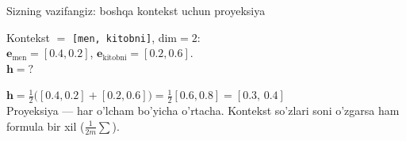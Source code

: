 \documentclass[aspectratio=169,11pt]{beamer}
\begin{document}
\begin{frame}{Sizning vazifangiz: boshqa kontekst uchun proyeksiya}
  \begin{tcolorbox}[warnbox,title=Savol --- 90 soniya]
    \small
    Kontekst $=$ \texttt{[men, kitobni]}, dim$=2$:\\[3pt]
    $\mathbf{e}_{\text{men}}=[0.4,0.2]$, \quad $\mathbf{e}_{\text{kitobni}}=[0.2,0.6]$.\\[4pt]
    \textbf{\large $\mathbf{h} = ?$}
  \end{tcolorbox}
  \pause
  \begin{tcolorbox}[okbox,title=Javob]
    \small
    $\mathbf{h} = \tfrac{1}{2}\big([0.4,0.2]+[0.2,0.6]\big)
       = \tfrac{1}{2}[0.6,0.8] = \mathbf{[0.3,\,0.4]}$\\[3pt]
    \footnotesize Proyeksiya --- har o'lcham bo'yicha o'rtacha. Kontekst
    so'zlari soni o'zgarsa ham formula bir xil ($\tfrac{1}{2m}\sum$).
  \end{tcolorbox}
\end{frame}
\end{document}
